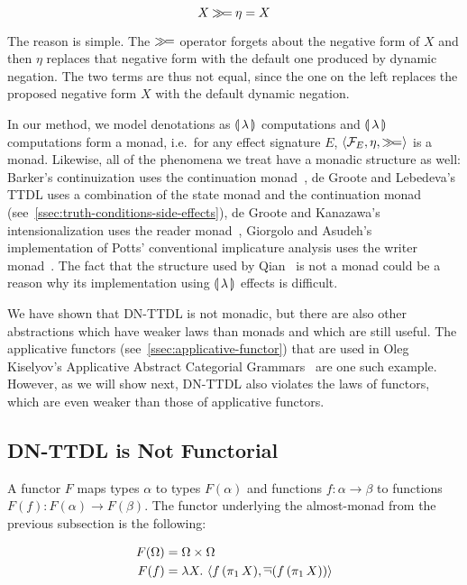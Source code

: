 $$
X \mathbin{\gg\!=} \eta = X
$$
 
The reason is simple. The $\mathbin{\gg\!=}$ operator forgets about the negative
form of $X$ and then $\eta$ replaces that negative form with the default
one produced by dynamic negation. The two terms are thus not equal, since
the one on the left replaces the proposed negative form $X$ with the
default dynamic negation.

In our method, we model denotations as $\llparenthesis \, \lambda \, \rrparenthesis$ computations and
$\llparenthesis \, \lambda \, \rrparenthesis$ computations form a monad, i.e.\ for any effect
signature $E$, $\left<\mathcal{F}_E, \eta, \mathbin{\gg\!=}\right>$ is a monad. Likewise,
all of the phenomena we treat have a monadic structure as well: Barker's
continuization uses the continuation monad~\cite{barker2002continuations},
de Groote and Lebedeva's TTDL uses a combination of the state monad and the
continuation monad~\cite{de2006towards,lebedeva2012expression}
(see~\ref{ssec:truth-conditions-side-effects}), de Groote and Kanazawa's
intensionalization uses the reader monad~\cite{de2013note}, Giorgolo and
Asudeh's implementation of Potts' conventional implicature analysis uses
the writer monad~\cite{giorgolo2011multidimensional}. The fact that the
structure used by Qian~\cite{qian2014accessibility} is not a monad could be
a reason why its implementation using $\llparenthesis \, \lambda \, \rrparenthesis$ effects is
difficult.

We have shown that DN-TTDL is not monadic, but there are also other
abstractions which have weaker laws than monads and which are still
useful. The applicative functors (see~\ref{ssec:applicative-functor}) that
are used in Oleg Kiselyov's Applicative Abstract Categorial
Grammars~\cite{kiselyov2015applicative,kiselyov2015swing} are one such
example. However, as we will show next, DN-TTDL also violates the laws of
functors, which are even weaker than those of applicative functors.


\subsection{DN-TTDL is Not Functorial}

A functor $F$ maps types $\alpha$ to types $F(\alpha)$ and functions
$f : \alpha \to \beta$ to functions $F(f) : F(\alpha) \to F(\beta)$. The
functor underlying the almost-monad from the previous subsection is the
following:

\begin{align*}
  F(\Omega) &= \Omega \times \Omega \\
  F(f) &= \lambda X.\, \left< f\,(\pi_1\,X), \mathop{\overline{\lnot}}(f\,(\pi_1\,X)) \right>
\end{align*}

